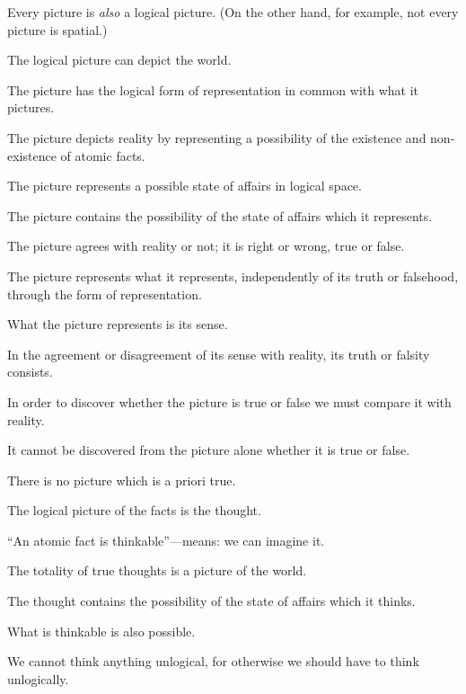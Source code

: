 {Every picture is \emph{also} a logical picture. (On the
other hand, for example, not every picture is spatial.)}


{The logical picture can depict the world.}


{The picture has the logical form of representation
in common with what it pictures.}


{The picture depicts reality by representing a
possibility of the existence and non-existence of
atomic facts.}


{The picture represents a possible state of affairs
in logical space.}


{The picture contains the possibility of the state
of affairs which it represents.}


{The picture agrees with reality or not; it is
right or wrong, true or false.}


{The picture represents what it represents, independently
of its truth or falsehood, through the
form of representation.}


{What the picture represents is its sense.}


{In the agreement or disagreement of its sense
with reality, its truth or falsity consists.}


{In order to discover whether the picture is true
or false we must compare it with reality.}


{It cannot be discovered from the picture alone
whether it is true or false.}


{There is no picture which is a priori true.}


{The logical picture of the facts is the
thought.}


{``An atomic fact is thinkable''---means: we can
imagine it.}


{The totality of true thoughts is a picture of the
world.}


{The thought contains the possibility of the state
of affairs which it thinks.
\enlargethispage{3pt} %

What is thinkable is also possible.}


{We cannot think anything unlogical, for otherwise
we should have to think unlogically.}


